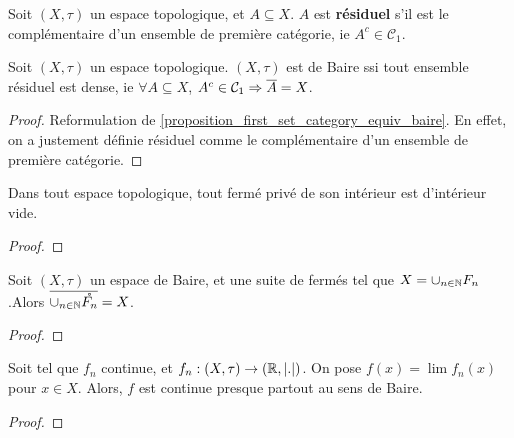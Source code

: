 \begin{definition}
	Soit $(X, \tau)$ un espace topologique, et $A \subseteq X$.
	$A$ est \textbf{résiduel} s'il est le complémentaire d'un ensemble de
	première catégorie, ie $A^{c} \in \mathcal{C}_{1}$.
\end{definition}

\begin{proposition}
	\label{proposition_residual_equiv_baire}
	Soit $(X, \tau)$ un espace topologique.
	$(X, \tau)$ est de Baire ssi tout ensemble résiduel est dense, ie $\forall A
	\subseteq X$, $A^{c} \in \mathcal{C}_{1} \Rightarrow \overline{A} = X$.
\end{proposition}

\begin{proof}
	Reformulation de \ref{proposition_first_set_category_equiv_baire}. En effet,
	on a justement définie résiduel comme le complémentaire d'un ensemble de
	première catégorie.
\end{proof}

\begin{proposition}
	Dans tout espace topologique, tout fermé privé de son intérieur est
	d'intérieur vide.
\end{proposition}

\begin{proof}
	
\end{proof}

 \begin{proposition}
	Soit $(X, \tau)$ un espace de Baire, et  une
	suite de fermés tel que $X = \displaystyle\cup_{n \in \mathbb{N}}F_{n}$.Alors
	$\displaystyle\overline{\cup_{n \in \mathbb{N}}\mathring{F_{n}}} = X$.
\end{proposition}

\begin{proof}
	
\end{proof}

\begin{theorem}
	\label{first_category_set_theorem_continued_function}
	Soit  tel que $f_{n}$ continue, et $f_{n} :
	(X, \tau) \rightarrow (\mathbb{R}, |.|)$.
	On pose $f(x) = \lim f_{n}(x)$ pour $x \in X$. Alors, $f$ est continue
	presque partout au sens de Baire.
\end{theorem}

\begin{proof}
	
\end{proof}

